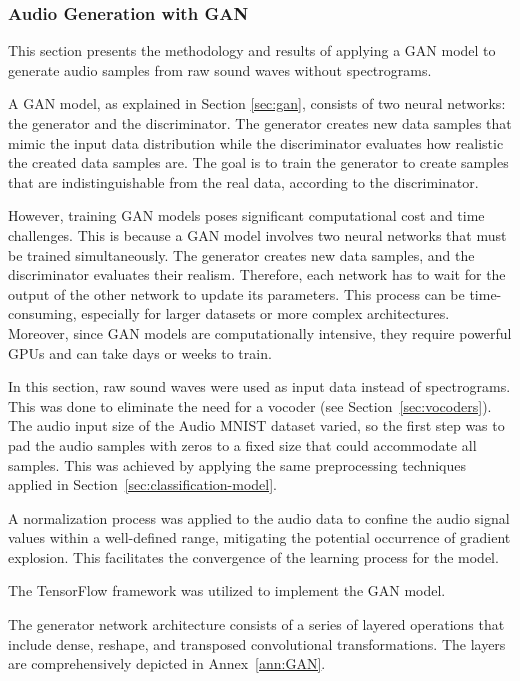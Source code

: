 \subsubsection{Audio Generation with GAN} \label{sec:sol-gan}

This section presents the methodology and results of applying a \ac{GAN} model to generate audio samples from raw sound waves without spectrograms.

A \ac{GAN} model, as explained in Section \ref{sec:gan}, consists of two neural networks: the generator and the discriminator. The generator creates new data samples that mimic the input data distribution while the discriminator evaluates how realistic the created data samples are. The goal is to train the generator to create samples that are indistinguishable from the real data, according to the discriminator.

However, training \ac{GAN} models poses significant computational cost and time challenges. This is because a \ac{GAN} model involves two neural networks that must be trained simultaneously. The generator creates new data samples, and the discriminator evaluates their realism. Therefore, each network has to wait for the output of the other network to update its parameters. This process can be time-consuming, especially for larger datasets or more complex architectures. Moreover, since \ac{GAN} models are computationally intensive, they require powerful \acp{GPU} and can take days or weeks to train.

In this section, raw sound waves were used as input data instead of spectrograms. This was done to eliminate the need for a vocoder (see Section~\ref{sec:vocoders}). The audio input size of the Audio MNIST dataset varied, so the first step was to pad the audio samples with zeros to a fixed size that could accommodate all samples. This was achieved by applying the same preprocessing techniques applied in Section~\ref{sec:classification-model}.

A normalization process was applied to the audio data to confine the audio signal values within a well-defined range, mitigating the potential occurrence of gradient explosion. This facilitates the convergence of the learning process for the model.

The TensorFlow framework was utilized to implement the \ac{GAN} model.

The generator network architecture consists of a series of layered operations that include dense, reshape, and transposed convolutional transformations. The layers are comprehensively depicted in Annex~\ref{ann:GAN}.

